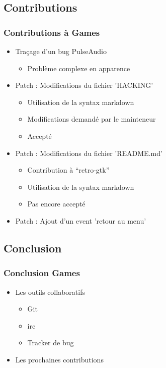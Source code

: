\documentclass{beamer}
\begin{document}
\subsection{Contributions}
\begin{frame}
  \frametitle{Contributions à Games}
  \begin{itemize}
  \item Traçage d'un bug PulseAudio \pause
    \begin{itemize}
      \item Problème complexe en apparence \pause
    \end{itemize}
  \item Patch : Modifications du fichier 'HACKING' \pause
    \begin{itemize}
    \item Utilisation de la syntax markdown
    \item Modifications demandé par le mainteneur
    \item Accepté \pause
    \end{itemize}
  \item Patch : Modifications du fichier 'README.md' \pause
    \begin{itemize}
    \item Contribution à ``retro-gtk''
    \item Utilisation de la syntax markdown
    \item Pas encore accepté \pause
    \end{itemize}
  \item Patch : Ajout d'un event 'retour au menu'
  \end{itemize}
\end{frame}

\subsection{Conclusion}
\begin{frame}
  \frametitle{Conclusion Games}
  \begin{itemize}
  \item Les outils collaboratifs \pause
    \begin{itemize}
    \item Git \pause
    \item irc \pause
    \item Tracker de bug \pause
    \end{itemize}
  \item Les prochaines contributions
  \end{itemize}
\end{frame}
\end{document}
